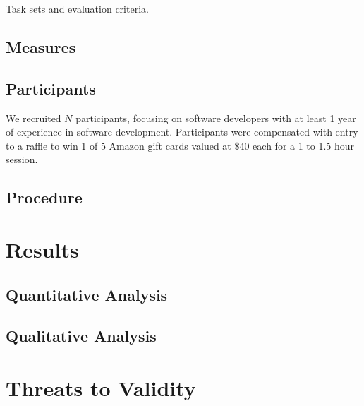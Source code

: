 Task sets and evaluation criteria.

\subsection{Measures}

\subsection{Participants}

We recruited $N$ participants, focusing on software developers with at least 1 year of experience in software development.
Participants were compensated with entry to a raffle to win 1 of 5 Amazon gift cards valued at $\$40$  each for a 1 to 1.5 hour session.

\subsection{Procedure}

\section{Results}
\label{sec:Results}

\subsection{Quantitative Analysis}

\subsection{Qualitative Analysis}

\section{Threats to Validity}
\label{sec:Threads-to-Validity}

\endinput

Any text after an \endinput is ignored.
You could put scraps here or things in progress.